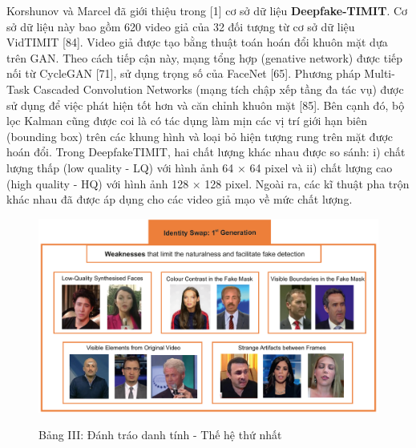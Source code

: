 \documentclass{article}
\begin{document}
Korshunov và Marcel đã giới thiệu trong [1] cơ sở dữ liệu \textbf{Deepfake-TIMIT}. Cơ sở dữ liệu này bao gồm 620 video giả của 32 đối tượng từ cơ sở dữ liệu VidTIMIT [84]. Video giả được tạo bằng thuật toán hoán đổi khuôn mặt dựa trên GAN. Theo cách tiếp cận này, mạng tổng hợp (genative network) được tiếp nối từ CycleGAN [71], sử dụng trọng số của FaceNet [65]. Phương pháp Multi-Task Cascaded Convolution Networks (mạng tích chập xếp tầng đa tác vụ) được sử dụng để việc phát hiện tốt hơn và căn chỉnh khuôn mặt [85]. Bên cạnh đó, bộ lọc Kalman cũng được coi là có tác dụng làm mịn các vị trí giới hạn biên (bounding box) trên các khung hình và loại bỏ hiện tượng rung trên mặt được hoán đổi. Trong DeepfakeTIMIT, hai chất lượng khác nhau được so sánh: i) chất lượng thấp (low quality - LQ) với hình ảnh 64 × 64 pixel và ii) chất lượng cao (high quality - HQ) với hình ảnh 128 × 128 pixel. Ngoài ra, các kĩ thuật pha trộn khác nhau đã được áp dụng cho các video giả mạo về mức chất lượng.

\begin{figure}[h!]
\caption{Bảng III: Đánh tráo danh tính - Thế hệ thứ nhất}
\includegraphics[width=\columnwidth]{fig-3-id-swap-gen1}
\label{fig-3-id-swap-gen1}
\end{figure}
\end{document}
